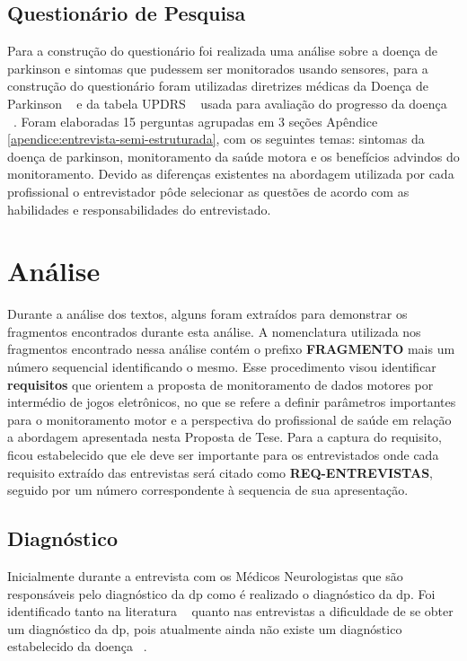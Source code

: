 \subsection{Questionário de Pesquisa}
Para a construção do questionário foi realizada uma análise sobre a doença de parkinson e sintomas que pudessem ser monitorados usando sensores, para a construção do questionário foram utilizadas diretrizes médicas da Doença de Parkinson ~\cite{protpar010,national2006parkinson} e da tabela UPDRS ~\cite{updrs87} usada para avaliação do progresso da doença ~\cite{updrs87}. Foram elaboradas 15 perguntas agrupadas em 3 seções Apêndice \ref{apendice:entrevista-semi-estruturada}, com os seguintes temas: sintomas da doença de parkinson, monitoramento da saúde motora e os benefícios advindos do monitoramento. Devido as diferenças existentes na abordagem utilizada por cada profissional o entrevistador pôde selecionar as questões de acordo com as habilidades e responsabilidades do entrevistado.

\section{Análise}
Durante a análise dos textos, alguns foram extraídos para demonstrar os fragmentos encontrados durante esta análise. A nomenclatura utilizada nos fragmentos encontrado nessa análise contém o prefixo \textbf{FRAGMENTO} mais um número sequencial identificando o mesmo. Esse procedimento visou identificar \textbf{requisitos} que orientem a proposta de monitoramento de dados motores por intermédio de jogos eletrônicos, no que se refere a definir parâmetros importantes para o monitoramento motor e a perspectiva do profissional de saúde em relação a abordagem apresentada nesta Proposta de Tese. Para a captura do requisito, ficou estabelecido que ele deve ser importante para os entrevistados onde cada requisito extraído das entrevistas será citado como \textbf{REQ-ENTREVISTAS}, seguido por um número correspondente à sequencia de sua apresentação.

\subsection{Diagnóstico}\label{section:analise_diagnostico}
Inicialmente durante a entrevista com os Médicos Neurologistas que são responsáveis pelo diagnóstico da \ac{dp} como é realizado o diagnóstico da \ac{dp}. Foi identificado tanto na literatura ~\cite{tolosa06,vedolin2003} quanto nas entrevistas a dificuldade de se obter um diagnóstico da \ac{dp}, pois atualmente ainda não existe um diagnóstico estabelecido da doença ~\cite{national2006parkinson,protpar010}. 

